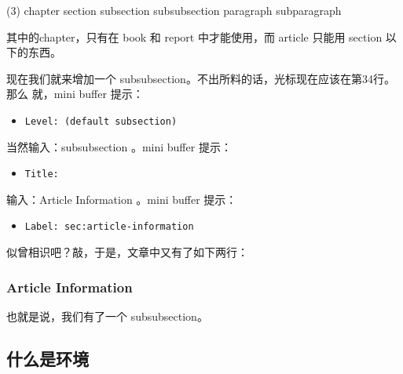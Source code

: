 \begin{minipage}{.9\linewidth}
  \begin{singlespace}
      \begin{tasks}(3)
      \task[] chapter
      \task[] section
      \task[] subsection
      \task[] subsubsection
      \task[] paragraph
      \task[] subparagraph
      \end{tasks}
  \end{singlespace}
\end{minipage}\par\vspace{2ex}

其中的chapter，只有在 book 和 report 中才能使用，而 article 只能用 section 以下的东西。

现在我们就来增加一个 subsubsection。不出所料的话，光标现在应该在第34行。那么
就，mini buffer 提示：

\begin{itemize}
\item[] \texttt{Level: (default subsection)}
\end{itemize}

当然输入：subsubsection 。mini buffer 提示：

\begin{itemize}
\item[] \texttt{Title:}
\end{itemize}

输入：Article Information 。mini buffer 提示：

\begin{itemize}
\item[] \texttt{Label: sec:article-information}
\end{itemize}

似曾相识吧？敲，于是，文章中又有了如下两行：
\begin{codeblock}[.9]
\begin{latexcode}
  \subsubsection{Article Information}
  \label{sec:article-information}
\end{latexcode}
\end{codeblock}
也就是说，我们有了一个 subsubsection。

\subsection{什么是环境}

